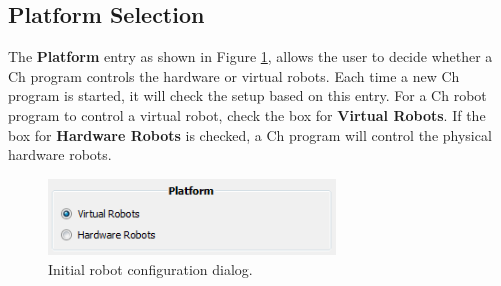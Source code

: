 \documentclass{article}
\begin{document}
\subsection{Platform Selection}
The {\bf Platform} entry as shown in Figure \ref{fig:platform}, allows the user
to decide whether a Ch program controls the hardware or virtual robots.  Each
time a new Ch program is started, it will check the setup based on this entry.
For a Ch robot program to control a virtual robot, check the box for {\bf
Virtual Robots}.  If the box for {\bf Hardware Robots} is checked, a Ch
program will control the physical hardware robots.
\begin{figure}[H]
	\begin{center}
		\includegraphics[width=3in]{pictures/gui_platform}
	\end{center}
	\caption{Initial robot configuration dialog.}
	\label{fig:platform}
\end{figure}
\end{document}
